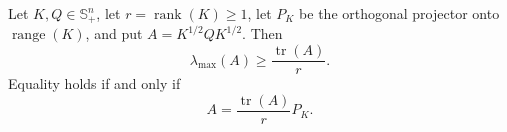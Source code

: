 Let \(K,Q\in\mathbb S_+^n\), let \(r=\operatorname{rank}(K)\ge1\), let \(P_K\) be the orthogonal projector onto \(\operatorname{range}(K)\), and put \(A=K^{1/2}QK^{1/2}\). Then
\[
\lambda_{\max}(A)\ge \frac{\operatorname{tr}(A)}r.
\]
Equality holds if and only if
\[
A=\frac{\operatorname{tr}(A)}rP_K.
\]